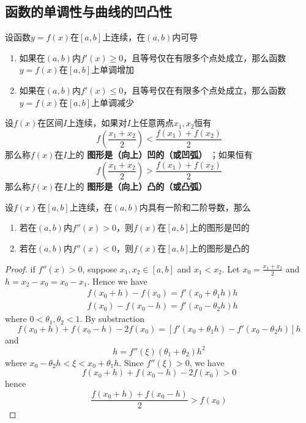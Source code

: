\documentclass[11pt]{article}
\begin{document}
\subsection{函数的单调性与曲线的凹凸性}
\label{sec:org1aed8a1}
\begin{theorem}[]
设函数\(y=f(x)\)在\([a,b]\)上连续，在\((a,b)\)内可导
\begin{enumerate}
\item 如果在\((a,b)\)内\(f'(x)\ge0\)，且等号仅在有限多个点处成立，那么函数
\(y=f(x)\)在\([a,b]\)上单调增加
\item 如果在\((a,b)\)内\(f'(x)\le0\)，且等号仅在有限多个点处成立，那么函数
\(y=f(x)\)在\([a,b]\)上单调减少
\end{enumerate}
\end{theorem}

\begin{definition}[]
设\(f(x)\)在区间\(I\)上连续，如果对\(I\)上任意两点\(x_1,x_2\)恒有
\begin{equation*}
f(\frac{x_1+x_2}{2})<\frac{f(x_1)+f(x_2)}{2}
\end{equation*}
那么称\(f(x)\)在\(I\)上的 \textbf{图形是（向上）凹的（或凹弧）} ；如果恒有
\begin{equation*}
f(\frac{x_1+x_2}{2})>\frac{f(x_1)+f(x_2)}{2}
\end{equation*}
那么称\(f(x)\)在\(I\)上的 \textbf{图形是（向上）凸的（或凸弧）}
\end{definition}

\begin{theorem}[]
设\(f(x)\)在\([a,b]\)上连续，在\((a,b)\)内具有一阶和二阶导数，那么
\begin{enumerate}
\item 若在\((a,b)\)内\(f''(x)>0\)，则\(f(x)\)在\([a,b]\)上的图形是凹的
\item 若在\((a,b)\)内\(f''(x)<0\)，则\(f(x)\)在\([a,b]\)上的图形是凸的
\end{enumerate}
\end{theorem}

\begin{proof}
if \(f''(x)>0\), suppose \(x_1,x_2\in[a,b]\) and \(x_1<x_2\). Let
\(x_0=\frac{x_1+x_2}{2}\) and \(h=x_2-x_0=x_0-x_1\). Hence we have
\begin{align*}
&f(x_0+h)-f(x_0)=f'(x_0+\theta_1 h)h\\
&f(x_0)-f(x_0-h)=f'(x_0-\theta_2h)h
\end{align*}
where \(0<\theta_1,\theta_2<1\). By substraction
\begin{equation*}
f(x_0+h)+f(x_0-h)-2f(x_0)=[f'(x_0+\theta_1h)-f'(x_0-\theta_2h)]h
\end{equation*}
and
\begin{equation*}
[f'(x_0+theta_1h)-f'(x_0-\theta_2h)]h=f''(\xi)(\theta_1+\theta_2)h^2
\end{equation*}
where \(x_0-\theta_2h<\xi<x_0+\theta_1h\). Since \(f''(\xi)>0\), we have
\begin{equation*}
f(x_0+h)+f(x_0-h)-2f(x_0)>0
\end{equation*}
hence
\begin{equation*}
\frac{f(x_0+h)+f(x_0-h)}{2}>f(x_0)
\end{equation*}
\end{proof}
\end{document}
